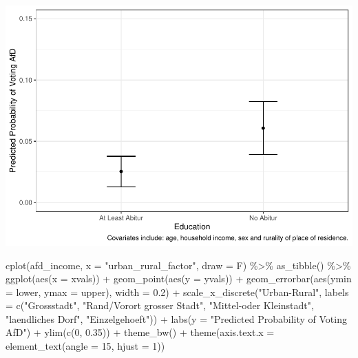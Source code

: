 \documentclass[
]{article}
\newenvironment{Shaded}{\begin{snugshade}}{\end{snugshade}}
\newcommand{\AttributeTok}[1]{\textcolor[rgb]{0.77,0.63,0.00}{#1}}
\newcommand{\DecValTok}[1]{\textcolor[rgb]{0.00,0.00,0.81}{#1}}
\newcommand{\FloatTok}[1]{\textcolor[rgb]{0.00,0.00,0.81}{#1}}
\newcommand{\FunctionTok}[1]{\textcolor[rgb]{0.00,0.00,0.00}{#1}}
\newcommand{\NormalTok}[1]{#1}
\newcommand{\SpecialCharTok}[1]{\textcolor[rgb]{0.00,0.00,0.00}{#1}}
\newcommand{\StringTok}[1]{\textcolor[rgb]{0.31,0.60,0.02}{#1}}
\begin{document}
\includegraphics{AVCD_Final_Assignment-Edenhofer_files/figure-latex/afd-education-1.pdf}

\begin{Shaded}
\begin{Highlighting}[]
\FunctionTok{cplot}\NormalTok{(afd\_income, }\AttributeTok{x =} \StringTok{"urban\_rural\_factor"}\NormalTok{, }\AttributeTok{draw =}\NormalTok{ F) }\SpecialCharTok{\%\textgreater{}\%}
  \FunctionTok{as\_tibble}\NormalTok{() }\SpecialCharTok{\%\textgreater{}\%}
  \FunctionTok{ggplot}\NormalTok{(}\FunctionTok{aes}\NormalTok{(}\AttributeTok{x =}\NormalTok{ xvals)) }\SpecialCharTok{+}
  \FunctionTok{geom\_point}\NormalTok{(}\FunctionTok{aes}\NormalTok{(}\AttributeTok{y =}\NormalTok{ yvals)) }\SpecialCharTok{+}
  \FunctionTok{geom\_errorbar}\NormalTok{(}\FunctionTok{aes}\NormalTok{(}\AttributeTok{ymin =}\NormalTok{ lower, }\AttributeTok{ymax =}\NormalTok{ upper), }\AttributeTok{width =} \FloatTok{0.2}\NormalTok{) }\SpecialCharTok{+}
  \FunctionTok{scale\_x\_discrete}\NormalTok{(}\StringTok{"Urban{-}Rural"}\NormalTok{, }
                   \AttributeTok{labels =} \FunctionTok{c}\NormalTok{(}\StringTok{"Grossstadt"}\NormalTok{, }\StringTok{"Rand/Vorort grosser Stadt"}\NormalTok{,}
                              \StringTok{"Mittel{-}oder Kleinstadt"}\NormalTok{, }\StringTok{"laendliches Dorf"}\NormalTok{,}
                              \StringTok{"Einzelgehoeft"}\NormalTok{)) }\SpecialCharTok{+}
 \FunctionTok{labs}\NormalTok{(}\AttributeTok{y =} \StringTok{"Predicted Probability of Voting AfD"}\NormalTok{) }\SpecialCharTok{+}
 \FunctionTok{ylim}\NormalTok{(}\FunctionTok{c}\NormalTok{(}\DecValTok{0}\NormalTok{, }\FloatTok{0.35}\NormalTok{)) }\SpecialCharTok{+}
 \FunctionTok{theme\_bw}\NormalTok{() }\SpecialCharTok{+}
 \FunctionTok{theme}\NormalTok{(}\AttributeTok{axis.text.x =} \FunctionTok{element\_text}\NormalTok{(}\AttributeTok{angle =} \DecValTok{15}\NormalTok{, }\AttributeTok{hjust =} \DecValTok{1}\NormalTok{))}
\end{Highlighting}
\end{Shaded}
\end{document}
